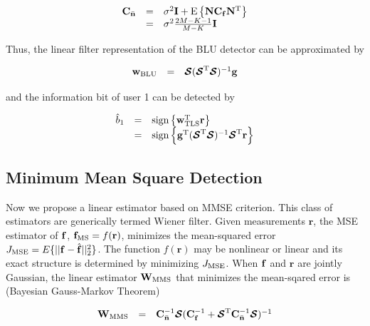 \documentclass[a4paper,11pt,fleqn]{article}
\newcommand{\br}{{\mathbf r}}
\newcommand{\bC}{{\bf C}}
\newcommand{\bg}{{\bf g}}
\newcommand{\bn}{{\bf n}}
\newcommand{\bw}{{\bf w}}
\newcommand{\bbf}{{\bf f}}
\newcommand{\bN}{{\bf N}}
\newcommand{\bI}{{\bf I}}
\newcommand{\bW}{{\bf W}}
\newcommand{\bcS}{{\mbox {\boldmath ${\cal S}$}}}
\begin{document}
\begin{equation}
\begin{array}{rcl}
\bC_{\bar\bn}&=&\sigma^{2}\bI+\mbox{E}\left\{{\bN}\bC_{\bbf}{\bN}^{\rm
T}\right\}\\
&=&\sigma^{2}\frac{2M-K-1}{M-K}\bI
\end{array}
\end{equation}


Thus, the linear filter representation of the BLU detector can be
approximated by


\begin{equation}
\begin{array}{rcl}
{\bw}_{\rm BLU}&=&\bcS(\bcS^{\rm T}\bcS)^{-1}\bg
\end{array}\label{w_BLUE_approx}
\end{equation}


\noindent and the information bit of user 1 can be detected by

\begin{equation}
\begin{array}{rcl}
\hat{b}_1&=&\mbox{sign}\left\{\bw_{\rm TLS}^{\rm T}\br\right\}\\
&=&\mbox{sign}\left\{\bg^{\rm T}(\bcS^{\rm T}\bcS)^{-1}\bcS^{\rm
T}\br\right\}
\end{array}
\end{equation}



\subsection{Minimum Mean Square Detection}
Now we propose a linear estimator based on MMSE criterion. This
class of estimators are generically termed Wiener filter. Given
measurements $\br$, the MSE estimator of $\bbf$, ${\bbf}_{\rm MS}
= f( \br )$, minimizes the mean-squared error $J_{\rm
MSE}=E\{||\bbf-\hat{\bbf}||_2^2\}$. The function $f(\br)$ may be
nonlinear or linear and its exact structure is determined by
minimizing $J_{\rm MSE}$. When $\bbf$ and $\br$ are jointly
Gaussian, the linear estimator $\bW_{\rm MMS}$ that minimizes the
mean-sqared error is (Bayesian Gauss-Markov Theorem)

\begin{equation}
\begin{array}{rcl}
{\bW}_{\rm MMS} &=&
\bC_{\bar{\bn}}^{-1}\bcS(\bC_{\bbf}^{-1}+\bcS^{\rm
T}\bC_{\bar{\bn}}^{-1}\bcS)^{-1}
\end{array}\label{W_MSE}
\end{equation}
\end{document}
